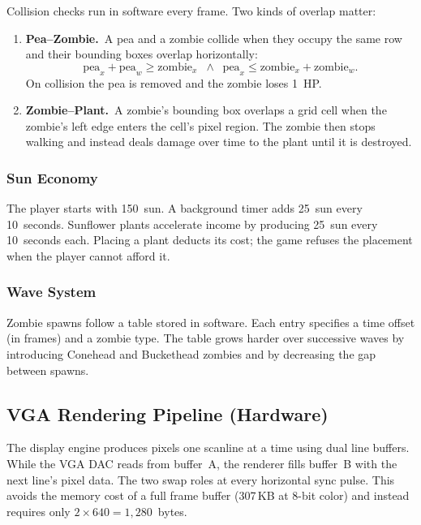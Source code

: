 \documentclass[11pt,letterpaper]{article}
\begin{document}
Collision checks run in software every frame. Two kinds of overlap
matter:

\begin{enumerate}[nosep]
  \item \textbf{Pea--Zombie.}\  A pea and a zombie collide when they
    occupy the same row and their bounding boxes overlap horizontally:
    \[
      \text{pea}_x + \text{pea}_w \geq \text{zombie}_x
      \;\;\wedge\;\;
      \text{pea}_x \leq \text{zombie}_x + \text{zombie}_w.
    \]
    On collision the pea is removed and the zombie loses 1~HP.

  \item \textbf{Zombie--Plant.}\  A zombie's bounding box overlaps a
    grid cell when the zombie's left edge enters the cell's pixel region.
    The zombie then stops walking and instead deals damage over time to
    the plant until it is destroyed.
\end{enumerate}

\subsubsection{Sun Economy}

The player starts with 150~sun. A background timer adds 25~sun every
10~seconds. Sunflower plants accelerate income by producing 25~sun
every 10~seconds each. Placing a plant deducts its cost; the game
refuses the placement when the player cannot afford it.

\subsubsection{Wave System}

Zombie spawns follow a table stored in software. Each entry specifies a
time offset (in frames) and a zombie type. The table grows harder over
successive waves by introducing Conehead and Buckethead zombies and by
decreasing the gap between spawns.

\subsection{VGA Rendering Pipeline (Hardware)}
\label{sec:algo-vga}

The display engine produces pixels one scanline at a time using dual
line buffers. While the VGA DAC reads from buffer~A, the renderer fills
buffer~B with the next line's pixel data. The two swap roles at every
horizontal sync pulse. This avoids the memory cost of a full frame
buffer (307\,KB at 8-bit color) and instead requires only
$2 \times 640 = 1{,}280$~bytes.
\end{document}
